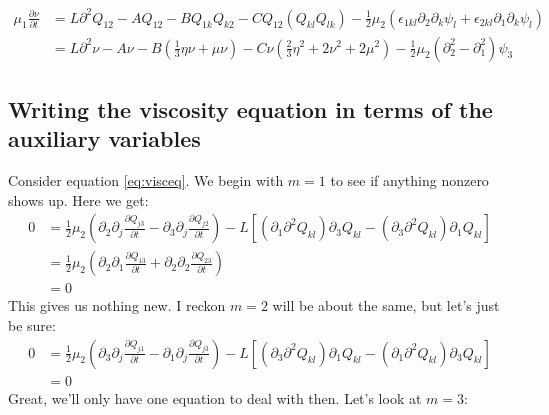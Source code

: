 \documentclass[reqno]{article}
\begin{document}
	\begin{equation}\label{eq:nueq}
	\begin{split}
		\mu_1 \frac{\partial \nu}{\partial t} 
		&= L\partial^2 Q_{12} 
		- A Q_{12} 
		- B Q_{1k}Q_{k2} 
		- C Q_{12}\left( Q_{kl}Q_{lk} \right) 
		- \frac{1}{2}\mu_2 \left( 
		\epsilon_{1kl}\partial_2\partial_k \psi_l + \epsilon_{2kl}\partial_1 \partial_k \psi_l 
		\right) \\
		&= L\partial^2\nu 
		- A\nu 
		- B\left( \frac{1}{3}\eta\nu + \mu\nu \right) 
		- C\nu\left( \frac{2}{3}\eta^2 + 2\nu^2 + 2\mu^2 \right)
		- \frac12 \mu_2 \left( \partial_2^2 - \partial_1^2 \right) \psi_3
	\end{split}
	\end{equation}
	
	\subsection{Writing the viscosity equation in terms of the auxiliary variables}
	Consider equation \eqref{eq:visceq}. We begin with $m = 1$ to see if anything nonzero shows up. Here we get:
	\begin{equation}
	\begin{split}
	0 &= \frac{1}{2}\mu_2\left( \partial_2 \partial_j \frac{\partial Q_{j3}}{\partial t} - \partial_3 \partial_j \frac{\partial Q_{j2}}{\partial t} \right) - L\left[ \left( \partial_1\partial^2 Q_{kl} \right) \partial_3 Q_{kl} - \left( \partial_3 \partial^2 Q_{kl} \right) \partial_1 Q_{kl} \right] \\
	&= \frac{1}{2}\mu_2 \left( \partial_2\partial_1 \frac{\partial Q_{13}}{\partial t} + \partial_2\partial_2 \frac{\partial Q_{23}}{\partial t} \right) \\
	&= 0
	\end{split}
	\end{equation}
	This gives us nothing new. I reckon $m = 2$ will be about the same, but let's just be sure:
	\begin{equation}
	\begin{split}
	0 &= \frac{1}{2}\mu_2 \left( \partial_3 \partial_j \frac{\partial Q_{j1}}{\partial t} - \partial_1\partial_j \frac{\partial Q_{j3}}{\partial t} \right) - L\left[ \left( \partial_3\partial^2 Q_{kl} \right)\partial_1 Q_{kl} - \left( \partial_1\partial^2 Q_{kl} \right)\partial_3 Q_{kl} \right] \\
	&= 0
	\end{split}
	\end{equation}
	Great, we'll only have one equation to deal with then. Let's look at $m = 3$:
\end{document}
